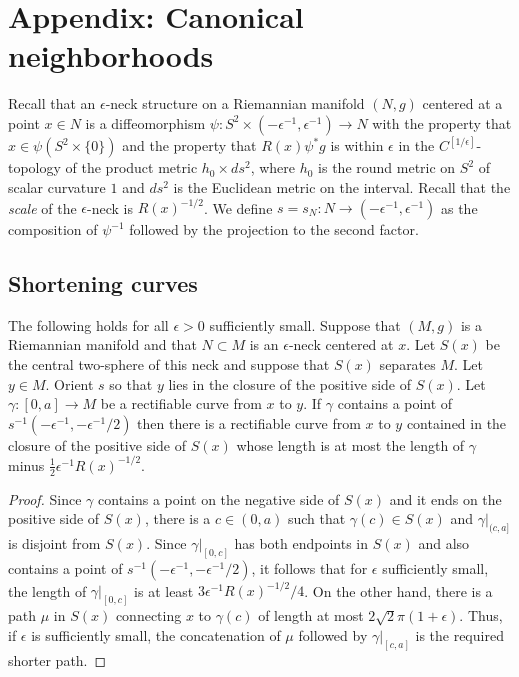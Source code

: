 \chapter{Appendix: Canonical neighborhoods}
\label{chap:canonical-neighborhoods}
\label{sect:canonnbhd}


Recall that an $\epsilon$-neck structure on a Riemannian manifold
$(N,g)$ centered at a point $x\in N$ is a diffeomorphism $\psi\colon
S^2\times (-\epsilon^{-1},\epsilon^{-1})\to N$ with the property
that $x\in \psi(S^2\times\{0\})$ and the property that $R(x)\psi^*g$
is within $\epsilon$ in the $C^{[1/\epsilon]}$-topology of the
product metric $h_0\times ds^2$, where $h_0$ is the round metric on
$S^2$ of scalar curvature $1$ and $ds^2$ is the Euclidean metric on
the interval. Recall that the {\em scale} of the $\epsilon$-neck is
$R(x)^{-1/2}$. We define $s=s_N\colon N\to
(-\epsilon^{-1},\epsilon^{-1})$ as the composition of $\psi^{-1}$
followed by the projection to the second factor.


\section{Shortening curves}

\begin{lemma}
\label{lem:neck-shortening-curve}
\label{curveshort}
The following holds for all $\epsilon>0$ sufficiently small. Suppose
that $(M,g)$ is a Riemannian manifold and that $N\subset M$ is an
$\epsilon$-neck centered at $x$. Let $S(x)$ be the central
two-sphere of this neck and suppose that $S(x)$ separates $M$. Let
$y\in M$. Orient $s$ so that $y$ lies in the closure of the positive
side of $S(x)$. Let $\gamma\colon [0,a]\to M$ be a rectifiable curve
from $x$ to $y$. If $\gamma$ contains a point of
$s^{-1}(-\epsilon^{-1},-\epsilon^{-1}/2)$ then there is a
rectifiable curve from $x$ to $y$ contained in the closure of the
positive side of $S(x)$ whose length is at most the length of
$\gamma$ minus $\frac{1}{2}\epsilon^{-1}R(x)^{-1/2}$.
\end{lemma}


\begin{proof}
Since $\gamma$ contains a point on the negative side of $S(x)$ and
it ends on the positive side of $S(x)$, there is a $c\in (0,a)$ such
that $\gamma(c)\in S(x)$ and $\gamma|_{(c,a]}$ is disjoint from
$S(x)$. Since $\gamma|_{[0,c]}$ has both endpoints in $S(x)$ and
also contains a point of $s^{-1}(-\epsilon^{-1},-\epsilon^{-1}/2)$,
it follows that for $\epsilon$ sufficiently small, the length of
$\gamma|_{[0,c]}$ is at least $3\epsilon^{-1}R(x)^{-1/2}/4$. On the
other hand, there is a path $\mu$ in $S(x)$ connecting $x$ to
$\gamma(c)$ of length at most $2\sqrt{2}\pi(1+\epsilon)$. Thus, if
$\epsilon$ is sufficiently small, the concatenation of $\mu$
followed by $\gamma|_{[c,a]}$ is the required shorter path.
\end{proof}



